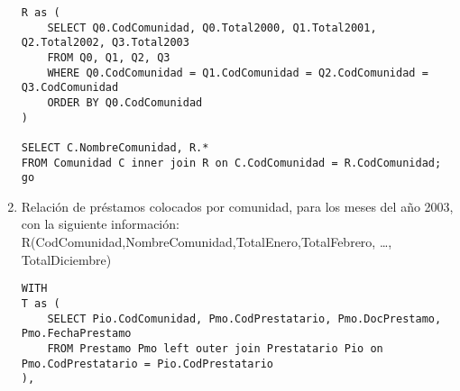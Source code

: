 \begin{enumerate}
\begin{verbatim}
R as (
    SELECT Q0.CodComunidad, Q0.Total2000, Q1.Total2001, Q2.Total2002, Q3.Total2003
    FROM Q0, Q1, Q2, Q3
    WHERE Q0.CodComunidad = Q1.CodComunidad = Q2.CodComunidad = Q3.CodComunidad
    ORDER BY Q0.CodComunidad
)

SELECT C.NombreComunidad, R.*
FROM Comunidad C inner join R on C.CodComunidad = R.CodComunidad;
go
\end{verbatim}

\item Relación de préstamos colocados por comunidad, para los meses del año 2003,
con la siguiente información:
R(CodComunidad,NombreComunidad,TotalEnero,TotalFebrero, …, TotalDiciembre)

\begin{verbatim}
WITH
T as (
    SELECT Pio.CodComunidad, Pmo.CodPrestatario, Pmo.DocPrestamo, Pmo.FechaPrestamo
    FROM Prestamo Pmo left outer join Prestatario Pio on Pmo.CodPrestatario = Pio.CodPrestatario
),


\end{verbatim}
\end{enumerate}
